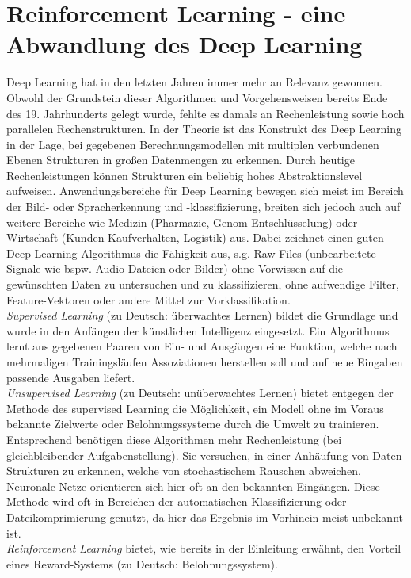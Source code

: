 \section{Reinforcement Learning - eine Abwandlung des Deep Learning}
\label{sec:rl_dl}
	Deep Learning hat in den letzten Jahren immer mehr an Relevanz gewonnen. Obwohl der Grundstein dieser Algorithmen und Vorgehensweisen bereits Ende des 19. Jahrhunderts gelegt wurde, fehlte es damals an Rechenleistung sowie hoch parallelen Rechenstrukturen. In der Theorie ist das Konstrukt des Deep Learning in der Lage, bei gegebenen Berechnungsmodellen mit multiplen verbundenen Ebenen Strukturen in großen Datenmengen zu erkennen. Durch heutige Rechenleistungen können Strukturen ein beliebig hohes Abstraktionslevel aufweisen. Anwendungsbereiche für Deep Learning bewegen sich meist im Bereich der Bild- oder Spracherkennung und -klassifizierung, breiten sich jedoch auch auf weitere Bereiche wie Medizin (Pharmazie, Genom-Entschlüsselung) oder Wirtschaft (Kunden-Kaufverhalten, Logistik) aus. Dabei zeichnet einen guten Deep Learning Algorithmus die Fähigkeit aus, s.g. Raw-Files (unbearbeitete Signale wie bspw. Audio-Dateien oder Bilder) ohne Vorwissen auf die gewünschten Daten zu untersuchen und zu klassifizieren, ohne aufwendige Filter, Feature-Vektoren oder andere Mittel zur Vorklassifikation.\\	
	\textit{Supervised Learning} (zu Deutsch: überwachtes Lernen) bildet die Grundlage und wurde in den Anfängen der künstlichen Intelligenz eingesetzt. Ein Algorithmus lernt aus gegebenen Paaren von Ein- und Ausgängen eine Funktion, welche nach mehrmaligen Trainingsläufen Assoziationen herstellen soll und auf neue Eingaben passende Ausgaben liefert.\\
	\textit{Unsupervised Learning} (zu Deutsch: unüberwachtes Lernen) bietet entgegen der Methode des supervised Learning die Möglichkeit, ein Modell ohne im Voraus bekannte Zielwerte oder Belohnungssysteme durch die Umwelt zu trainieren. Entsprechend benötigen diese Algorithmen mehr Rechenleistung (bei gleichbleibender Aufgabenstellung). Sie versuchen, in einer Anhäufung von Daten Strukturen zu erkennen, welche von stochastischem Rauschen abweichen. Neuronale Netze orientieren sich hier oft an den bekannten Eingängen. Diese Methode wird oft in Bereichen der automatischen Klassifizierung oder Dateikomprimierung genutzt, da hier das Ergebnis im Vorhinein meist unbekannt ist.\\
	\textit{Reinforcement Learning} bietet, wie bereits in der Einleitung erwähnt, den Vorteil eines Reward-Systems (zu Deutsch: Belohnungssystem).
